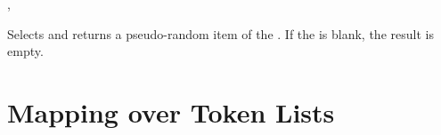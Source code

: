 \documentclass[oneside]{book}
\begin{document}
\begin{function}{\tlRandItem,\tlVarRandItem}
\begin{syntax}
 
 
\end{syntax}
Selects and returns a pseudo-random item of the .
If the  is blank, the result is empty.
\begin{demohigh}
\end{demohigh}
\end{function}

\section{Mapping over Token Lists}


%
\end{document}
